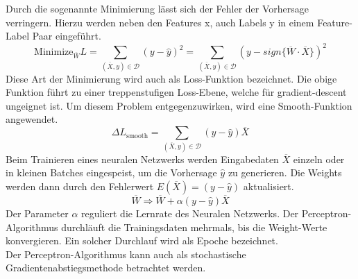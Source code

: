\noindent 
Durch die sogenannte Minimierung lässt sich der Fehler der Vorhersage verringern. Hierzu werden neben den Features x, auch Labels y in einem Feature-Label Paar eingeführt. 
$$\text{Minimize}_{\overline{W}}L = \sum\limits_{(\overline{X},y)\in \mathcal{D}}(y - \hat{y})^2 = \sum\limits_{(\overline{X},y)\in \mathcal{D}}(y - sign\{\overline{W} \cdot \overline{X}\})^2$$
Diese Art der Minimierung wird auch als Loss-Funktion bezeichnet. Die obige Funktion führt zu einer treppenstufigen Loss-Ebene, welche für gradient-descent ungeignet ist. Um diesem Problem entgegenzuwirken, wird eine Smooth-Funktion angewendet.
$$\Delta L_{\text{smooth}} = \sum\limits_{(\overline{X},y)\in \mathcal{D}}(y - \hat{y})\overline{X}$$
Beim Trainieren eines neuralen Netzwerks werden Eingabedaten $\overline{X}$ einzeln oder in kleinen Batches eingespeist, um die Vorhersage $\hat{y}$ zu generieren. Die Weights werden dann durch den Fehlerwert $E(\overline{X}) = (y - \hat{y})$ aktualisiert.
$$\overline{W} \Rightarrow \overline{W} + \alpha(y - \hat{y})\overline{X}$$
Der Parameter $\alpha$ reguliert die Lernrate des Neuralen Netzwerks. Der Perceptron-Algorithmus durchläuft die Trainingsdaten mehrmals, bis die Weight-Werte konvergieren. Ein solcher Durchlauf wird als Epoche bezeichnet.\\
Der Perceptron-Algorithmus kann auch als stochastische Gradientenabstiegsmethode betrachtet werden. \cite{CA18}